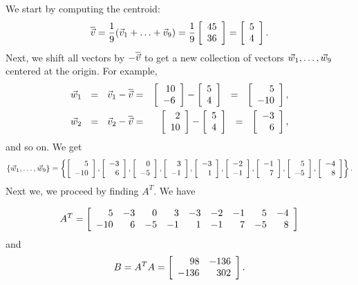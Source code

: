 \documentclass{ximera}
\begin{document}
  \begin{solution}
    We start by computing the centroid:
    \begin{equation*}
      \centroid{\vect{v}} =
      \frac{1}{9}(\vect{v}_1+\ldots+\vect{v}_9)
      = \frac{1}{9}\startmat{r} 45 \\ 36 \stopmat
      = \startmat{r} 5 \\ 4 \stopmat.
    \end{equation*}
    Next, we shift all vectors by $-\centroid{\vect{v}}$ to get a new
    collection of vectors $\vect{w}_1,\ldots,\vect{w}_9$ centered at the
    origin.
    For example,
    \begin{eqnarray*}
      \vect{w}_1 ~~=~~ \vect{v}_1 - \centroid{\vect{v}}
      &=& \startmat{r} 10 \\ -6 \stopmat
      - \startmat{r} 5 \\ 4 \stopmat
      ~~=~~ \startmat{r} 5 \\ -10 \stopmat,
      \\
      \vect{w}_2 ~~=~~ \vect{v}_2 - \centroid{\vect{v}}
      &=& \startmat{r} 2 \\ 10 \stopmat
      - \startmat{r} 5 \\ 4 \stopmat
      ~~=~~ \startmat{r} -3 \\ 6 \stopmat,
    \end{eqnarray*}
    and so on. We get
    \begin{equation*}
      \set{\vect{w}_1,\ldots,\vect{w}_9} =
      \set{
        \startmat{r} 5 \\ -10 \stopmat,
        \startmat{r} -3 \\ 6 \stopmat,
        \startmat{r} 0 \\ -5 \stopmat,
        \startmat{r} 3 \\ -1 \stopmat,
        \startmat{r} -3 \\ 1 \stopmat,
        \startmat{r} -2 \\ -1 \stopmat,
        \startmat{r} -1 \\ 7 \stopmat,
        \startmat{r} 5 \\ -5 \stopmat,
        \startmat{r} -4 \\ 8 \stopmat
      }.
    \end{equation*}
    Next we, we proceed by finding $A^T$. We have

    \begin{equation*}
      A^T = \startmat{rrrrrrrrr}
        5 & -3 & 0 & 3 & -3 & -2 & -1 & 5 & -4 \\
        -10 & 6 & -5 & -1 & 1 & -1 & 7 & -5 & 8 \\
      \stopmat
    \end{equation*}
    and
    \begin{equation*}
      B = A^TA = \startmat{rr}
        98 & -136 \\
        -136 & 302 \\
      \stopmat.
    \end{equation*}


\end{solution}
\end{document}
